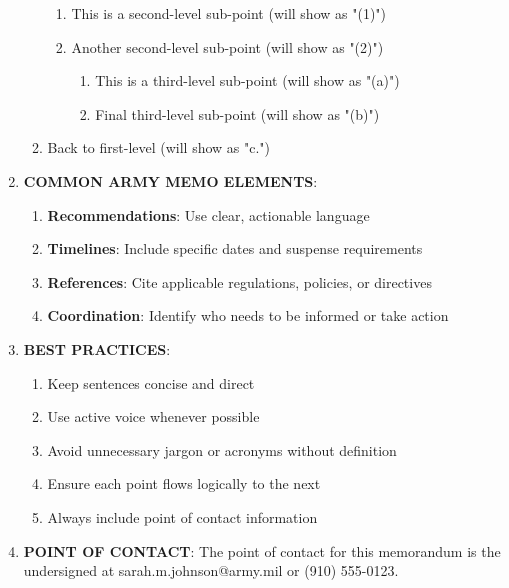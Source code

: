 \documentclass{/app/resources/latex/armymemo-notikz}
\begin{document}
\begin{enumerate}
\begin{enumerate}
\begin{enumerate}
\item This is a second-level sub-point (will show as "(1)")
\item Another second-level sub-point (will show as "(2)")
\begin{enumerate}
\item This is a third-level sub-point (will show as "(a)")
\item Final third-level sub-point (will show as "(b)")
\end{enumerate}
\end{enumerate}
\item Back to first-level (will show as "c.")
\end{enumerate}
\item \textbf{COMMON ARMY MEMO ELEMENTS}:
\begin{enumerate}
\item \textbf{Recommendations}: Use clear, actionable language
\item \textbf{Timelines}: Include specific dates and suspense requirements
\item \textbf{References}: Cite applicable regulations, policies, or directives
\item \textbf{Coordination}: Identify who needs to be informed or take action
\end{enumerate}
\item \textbf{BEST PRACTICES}:
\begin{enumerate}
\item Keep sentences concise and direct
\item Use active voice whenever possible
\item Avoid unnecessary jargon or acronyms without definition
\item Ensure each point flows logically to the next
\item Always include point of contact information
\end{enumerate}
\item \textbf{POINT OF CONTACT}: The point of contact for this memorandum is the undersigned at sarah.m.johnson@army.mil or (910) 555-0123.
\end{enumerate}
\end{document}
